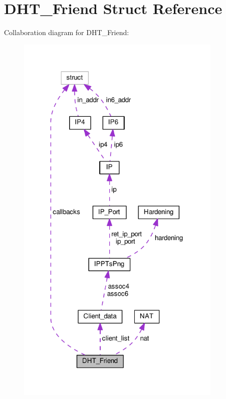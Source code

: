 \hypertarget{struct_d_h_t___friend}{\section{D\+H\+T\+\_\+\+Friend Struct Reference}
\label{struct_d_h_t___friend}
}


Collaboration diagram for D\+H\+T\+\_\+\+Friend\+:\nopagebreak
\begin{figure}[H]
\begin{center}
\leavevmode
\includegraphics[width=279pt]{struct_d_h_t___friend__coll__graph}
\end{center}
\end{figure}
